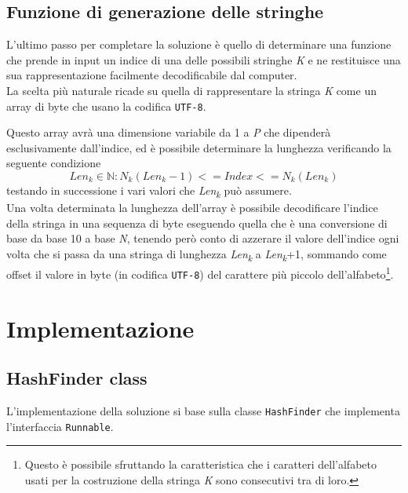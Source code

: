 \documentclass{article}
\begin{document}
    \subsection{Funzione di generazione delle stringhe}
    L'ultimo passo per completare la soluzione è quello di determinare una funzione che prende in input un indice di una delle possibili stringhe \textit{K} e ne restituisce una sua rappresentazione facilmente decodificabile dal computer.\\
    La scelta più naturale ricade su quella di rappresentare la stringa \textit{K} come un array di byte che usano la codifica \verb|UTF-8|.
    \newpage    %

    Questo array avrà una dimensione variabile da 1 a \textit{P} che dipenderà esclusivamente dall'indice, ed è possibile determinare la lunghezza verificando la seguente condizione
    \[ Len_{k} \in \mathbb{N}: N_{k}(Len_{k}-1) <= Index <= N_{k}(Len_{k}) \]
    testando in successione i vari valori che \textit{Len\textsubscript{k}} può assumere.\\

    Una volta determinata la lunghezza dell'array è possibile decodificare l'indice della stringa in una sequenza di byte eseguendo quella che è una conversione di base da base 10 a base \textit{N}, tenendo però conto di azzerare il valore dell'indice ogni volta che si passa da una stringa di lunghezza \textit{Len\textsubscript{k}} a \textit{Len\textsubscript{k}}+1, sommando come offset il valore in byte (in codifica \verb|UTF-8|) del carattere più piccolo dell'alfabeto\footnote{Questo è possibile sfruttando la caratteristica che i caratteri dell'alfabeto usati per la costruzione della stringa \textit{K} sono consecutivi tra di loro.}.
    \newpage    %

    \section{Implementazione}
    \subsection{HashFinder class}
    L'implementazione della soluzione si base sulla classe \verb|HashFinder| che implementa l'interfaccia \verb|Runnable|.\\
\end{document}
